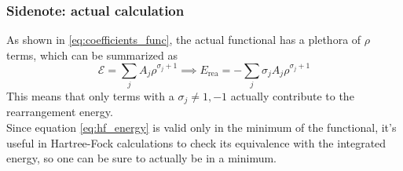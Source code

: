 \subsubsection{Sidenote: actual calculation}
As shown in \ref{eq:coefficients_func}, the actual functional has a plethora of $\rho$ terms, which can be summarized as
\begin{equation}
    \mathcal E = \sum_j A_j \rho^{\sigma_j+1} \implies E_\text{rea} = -\sum_j \sigma_j A_j \rho^{\sigma_j+1} 
\end{equation}
This means that only terms with a $\sigma_j\neq 1, -1$ actually contribute to the rearrangement energy.
\\Since equation \ref{eq:hf_energy} is valid only in the minimum of the functional, it's useful in Hartree-Fock calculations to check its equivalence with the integrated energy, so one can be sure to actually be in a minimum.